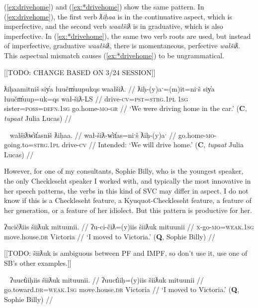 (\ref{ex:drivehome}) and (\ref{ex:*drivehome}) show the same pattern. In (\ref{ex:drivehome}), the first verb \textit{ƛiḥaa} is in the continuative aspect, which is imperfective, and the second verb \textit{waałšiƛ} is in graduative, which is also imperfective. In (\ref{ex:*drivehome}), the same two verb roots are used, but instead of imperfective, graduative \textit{waałšiƛ}, there is momentaneous, perfective \textit{wałšiƛ}. This aspectual mismatch causes (\ref{ex:*drivehome}) to be ungrammatical.

[[TODO: CHANGE BASED ON 3/24 SESSION]]

\ex \label{ex:drivehome}
\begingl
\glpreamble ƛiḥaamitniš siy̓a łuučm̓uupukqs waałšiƛ. //
\gla ƛiḥ-(y)aˑ=(m)it=niˑš siy̓a łuučm̓uup=uk=qs wał-šiƛ-LS //
\glb drive-\textsc{cv}=\textsc{pst}=\textsc{strg.1pl} \textsc{1sg} sister=\textsc{poss}=\textsc{defn.1sg} go.home-\textsc{mo}-\textsc{gr} //
\glft `We were driving home in the car.' (\textbf{C}, \textit{tupaat} Julia Lucas) //
\endgl
\xe

\ex~ \label{ex:*drivehome}
\begingl
\glpreamble *wałšiƛw̓it̓asniš ƛiḥaa. //
\gla wał-šiƛ-w̓it̓as=niˑš ƛiḥ-(y)aˑ //
\glb go.home-\textsc{mo}-going.to=\textsc{strg.1pl} drive-\textsc{cv} //
\glft Intended: `We will drive home.' (\textbf{C}, \textit{tupaat} Julia Lucas) //
\endgl
\xe

However, for one of my consultants, Sophie Billy, who is the youngest speaker, the only Checkleseht speaker I worked with, and typically the most innovative in her speech patterns, the verbs in this kind of SVC may differ in aspect. I do not know if this is a Checkleseht feature, a Kyuquot-Checkleseht feature, a feature of her generation, or a feature of her idiolect. But this pattern is productive for her.

\ex \label{ex:movetovictoria1}
\begingl
\glpreamble ʔucičƛiis šiiƛuk mituunii. //
\gla ʔu-ci-čiƛ=(y)iis šiiƛuk mituunii  //
\glb \textsc{x}-go-\textsc{mo}=\textsc{weak.1sg} move.house.\textsc{dr} Victoria //
\glft `I moved to Victoria.' (\textbf{Q}, Sophie Billy) //
\endgl
\xe

[[TODO: šiiƛuk is ambiguous between PF and IMPF, so don’t use it, use one of SB’s other examples.]]

\ex~ \label{ex:movetovictoria2}
\begingl
\glpreamble ʔuuct̓iiḥiis šiiƛuk mituunii. //
\gla ʔuuct̓iiḥ=(y)iis šiiƛuk mituunii  //
\glb go.toward.\textsc{dr}=\textsc{weak.1sg} move.house.\textsc{dr} Victoria //
\glft `I moved to Victoria.' (\textbf{Q}, Sophie Billy) //
\endgl
\xe

